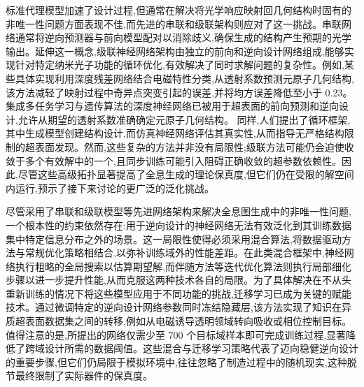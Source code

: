 标准代理模型加速了设计过程,但通常在解决将光学响应映射回几何结构时固有的非唯一性问题方面表现不佳,而先进的串联和级联架构则应对了这一挑战。串联网络通常将逆向预测器与前向模型配对以消除歧义,确保生成的结构产生预期的光学输出。延伸这一概念,级联神经网络架构由独立的前向和逆向设计网络组成,能够实现针对特定纳米光子功能的循环优化,有效解决了同时求解问题的复杂性。例如,某些具体实现利用深度残差网络结合电磁特性分类,从透射系数预测元原子几何结构,该方法减轻了映射过程中奇异点突变引起的误差,并将均方误差降低至小于 0.23。集成多任务学习与遗传算法的深度神经网络已被用于超表面的前向预测和逆向设计,允许从期望的透射系数准确确定元原子几何结构。\citep{doi_10_1016_j_rio_2026_100988_b00ee173} 同样,人们提出了循环框架,其中生成模型创建结构设计,而仿真神经网络评估其真实性,从而指导无严格结构限制的超表面发现。然而,这些复杂的方法并非没有局限性;级联方法可能仍会迫使收敛于多个有效解中的一个,且同步训练可能引入阻碍正确收敛的超参数依赖性。因此,尽管这些高级拓扑显著提高了全息生成的理论保真度,但它们仍在受限的解空间内运行,预示了接下来讨论的更广泛的泛化挑战。\citep{doi_10_1038_s41598_020_76400_y_aa62c15d} \citep{doi_10_1109_iccem60619_2024_10559188_c3199408}

尽管采用了串联和级联模型等先进网络架构来解决全息图生成中的非唯一性问题,一个根本性的约束依然存在:用于逆向设计的神经网络无法有效泛化到其训练数据集中特定信息分布之外的场景。这一局限性使得必须采用混合算法,将数据驱动方法与常规优化策略相结合,以弥补训练域外的性能差距。在此类混合框架中,神经网络执行粗略的全局搜索以估算期望解,而伴随方法等迭代优化算法则执行局部细化步骤以进一步提升性能,从而克服这两种技术各自的局限。为了具体解决在不从头重新训练的情况下将这些模型应用于不同功能的挑战,迁移学习已成为关键的赋能技术。通过微调特定的逆向设计网络参数同时冻结隐藏层,该方法实现了知识在异质超表面数据集之间的转移,例如从电磁诱导透明领域转向吸收或相位控制目标。\citep{doi_10_1364_ol_514212_108a4a7f} \citep{doi_10_1109_ieeeconf35879_2020_9330480_27bef614} 值得注意的是,所提出的网络仅需少至 700 个目标域样本即可完成训练过程,显著降低了跨域设计所需的数据阈值。这些混合与迁移学习策略代表了迈向稳健逆向设计的重要步骤,但它们仍局限于模拟环境中,往往忽略了制造过程中的随机现实,这种脱节最终限制了实际器件的保真度。\citep{doi_10_1021_acsphotonics_2c00968_06a2e96b} \citep{doi_10_1364_ol_514212_108a4a7f}

